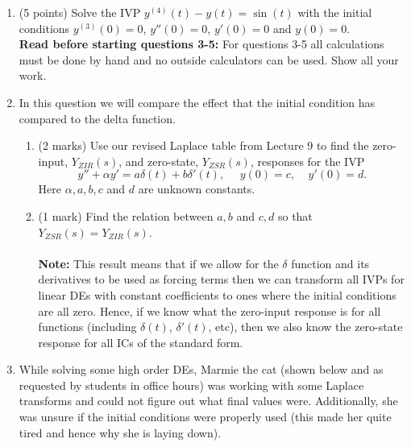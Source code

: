\documentclass[11pt,a4paper]{article}
\begin{document}
\begin{enumerate}
		\item (5 points) Solve the IVP $y^{(4)}(t)-y(t)=\sin(t)$ with the  initial conditions $y^{(3)}(0)=0$, $y''(0)=0$, $y'(0)=0$ and $y(0)=0$. \\
		
	
		
		
		\noindent \textbf{Read before starting questions 3-5:} For questions 3-5 all calculations must be done by hand and no outside calculators can be used. Show all your work. 
	
		\item In this question we will compare the effect that the initial condition has compared to the delta function.
		
		\begin{enumerate}
			\item (2 marks) Use our revised Laplace table from Lecture 9 to find the zero-input, $Y_{ZIR}(s)$, and zero-state, $Y_{ZSR}(s)$, responses for the IVP 
			\[
			y''+\alpha y'=a\delta(t)+b\delta'(t),~~~~~~ y(0)=c, ~~~~~y'(0)=d.
			\]
			Here $\alpha, a,b,c$ and $d$ are unknown constants. 
			
			\item (1 mark) Find the relation between $a,b$ and $c,d$ so that $Y_{ZSR}(s)=Y_{ZIR}(s)$.\\~\\
			
			\textbf{Note: }This result means that if we allow for the $\delta$ function and its derivatives to be used as forcing terms then we can transform all IVPs for linear DEs with constant coefficients to ones where the initial conditions are all zero. Hence, if we know what the zero-input response is for all functions (including $\delta(t)$, $\delta'(t)$, etc), then we also know the zero-state response for all ICs of the standard form.
		\end{enumerate}
	
	

		
		
		
		
		
		
		

				
		\item While solving some high order DEs, Marmie the cat (shown below and as requested by students in office hours) was working with some Laplace transforms and could not figure out what final values were. Additionally, she was unsure if the initial conditions were properly used (this made her quite tired and hence why she is laying down).
		

\end{enumerate}
\end{document}
